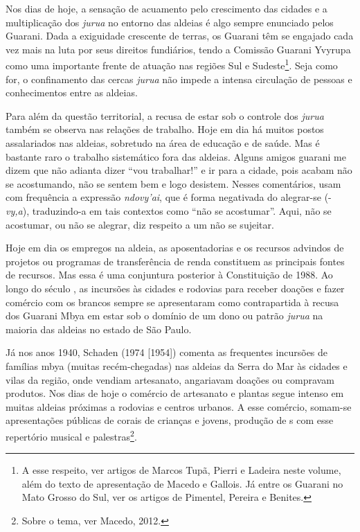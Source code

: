 {Nos dias de hoje, a sensação de acuamento pelo crescimento das cidades e
a multiplicação dos \emph{jurua} no entorno das aldeias é algo sempre
enunciado pelos Guarani. Dada a exiguidade crescente de terras, os
Guarani têm se engajado cada vez mais na luta por seus direitos
fundiários, tendo a Comissão Guarani Yvyrupa como uma importante frente
de atuação nas regiões Sul e Sudeste\footnote{A esse respeito, ver
artigos de Marcos Tupã, Pierri e Ladeira neste volume, além do texto de
apresentação de Macedo e Gallois. Já entre os Guarani no Mato Grosso do
Sul, ver os artigos de Pimentel, Pereira e Benites.}. Seja como for, o
confinamento das cercas \emph{jurua} não impede a intensa circulação de
pessoas e conhecimentos entre as aldeias. 

Para além da questão territorial, a recusa de estar sob o controle dos
\emph{jurua} também se observa nas relações de trabalho. Hoje em dia há muitos
postos assalariados nas aldeias, sobretudo na área de educação e de
saúde. Mas é bastante raro o trabalho sistemático fora das aldeias.
Alguns amigos guarani me dizem que não adianta dizer ``vou trabalhar!'' e
ir para a cidade, pois acabam não se acostumando, não se sentem bem e
logo desistem. Nesses comentários, usam com frequência a expressão
\emph{ndovy’ai}, que é forma negativada do alegrar-se (-\emph{vy,a}), traduzindo-a em
tais contextos como ``não se acostumar''. Aqui, não se acostumar, ou não
se alegrar, diz respeito a um não se sujeitar.

Hoje em dia os empregos na aldeia, as aposentadorias e os recursos
advindos de projetos ou programas de transferência de renda constituem
as principais fontes de recursos. Mas essa é uma conjuntura posterior à
Constituição de 1988. Ao longo do século , as incursões às cidades e
rodovias para receber doações e fazer comércio com os brancos sempre se
apresentaram como contrapartida à recusa dos Guarani Mbya em estar sob
o domínio de um dono ou patrão \emph{jurua} na maioria das aldeias no estado
de São Paulo. 

Já nos anos 1940, Schaden (1974 [1954]) comenta as frequentes incursões
de famílias mbya (muitas recém-chegadas) nas aldeias da Serra do Mar às
cidades e vilas da região, onde vendiam artesanato, angariavam doações
ou compravam produtos. Nos dias de hoje o comércio de artesanato e
plantas segue intenso em muitas aldeias próximas a rodovias e centros
urbanos. A esse comércio, somam-se apresentações públicas de corais de
crianças e jovens, produção de s com esse repertório musical e
palestras\footnote{Sobre o tema, ver Macedo, 2012.}. 

}
